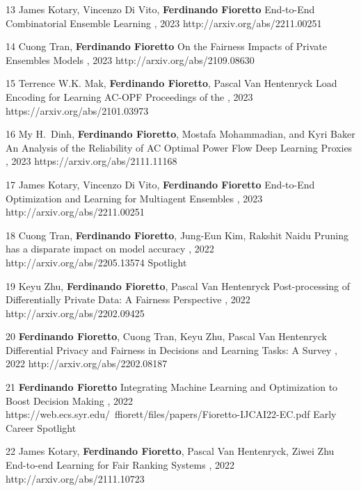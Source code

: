 \documentclass[localFont,alternative]{documentMETADATA}
\begin{document}
\begin{pubs}
\confentryShort
  {13} %
	{{James Kotary}, {Vincenzo Di Vito}, {\bf Ferdinando Fioretto}}
	{End-to-End Combinatorial Ensemble Learning}
  {\procIJCAI, 2023}
	{http://arxiv.org/abs/2211.00251}

\confentryShort
  {14} %
	{{Cuong Tran}, {\bf Ferdinando Fioretto}}
	{On the Fairness Impacts of Private Ensembles Models}
    {\procIJCAI, 2023}
	{http://arxiv.org/abs/2109.08630}

\confentryShort
	{15} %
	{Terrence W.K. Mak, {\bf Ferdinando Fioretto}, Pascal Van Hentenryck}
	{Load Encoding for Learning AC-OPF}
	{Proceedings of the , 2023}
	{https://arxiv.org/abs/2101.03973}

\confentryShort
	{16}
	{{My H.~Dinh}, {\bf Ferdinando Fioretto}, Mostafa Mohammadian, and Kyri Baker}
	{An Analysis of the Reliability of AC Optimal Power Flow Deep Learning Proxies}
	{, 2023}
	{https://arxiv.org/abs/2111.11168}

\confentryShort
  {17} %
	{{James Kotary}, {Vincenzo Di Vito}, {\bf Ferdinando Fioretto}}
	{End-to-End Optimization and Learning for Multiagent Ensembles}
    {\procAAMAS, 2023}
	{http://arxiv.org/abs/2211.00251}

\confentryShortAwd
	{18} %
	{{Cuong Tran}, {\bf Ferdinando Fioretto}, Jung-Eun Kim, {Rakshit Naidu}}
	{Pruning has a disparate impact on model accuracy}
	{\procNeurIPS, 2022}
	{http://arxiv.org/abs/2205.13574}
	{Spotlight}

	\confentryShort
	{19} %
	{Keyu Zhu, {\bf Ferdinando Fioretto}, Pascal Van Hentenryck}
	{Post-processing of Differentially Private Data: A Fairness Perspective}
	{\procIJCAI, 2022}
	{http://arxiv.org/abs/2202.09425}	

	\confentryShort
	{20} %
	{{\bf Ferdinando Fioretto}, {Cuong Tran}, Keyu Zhu, Pascal Van Hentenryck}
	{Differential Privacy and Fairness in Decisions and Learning Tasks: A Survey}
	{\procIJCAI, 2022}
	{http://arxiv.org/abs/2202.08187}	

	\confentryShortAwd
	{21} %
	{{\bf Ferdinando Fioretto}}
	{Integrating Machine Learning and Optimization to Boost Decision Making}
	{\procIJCAI, 2022}
	{https://web.ecs.syr.edu/~ffiorett/files/papers/Fioretto-IJCAI22-EC.pdf}	
	{Early Career Spotlight}

	\confentryShort
	{22} %
	{{James Kotary}, {\bf Ferdinando Fioretto}, Pascal Van Hentenryck, Ziwei Zhu}
	{End-to-end Learning for Fair Ranking Systems}
	{\procWWW, 2022}
	{http://arxiv.org/abs/2111.10723}	
	

\end{pubs}
\end{document}
